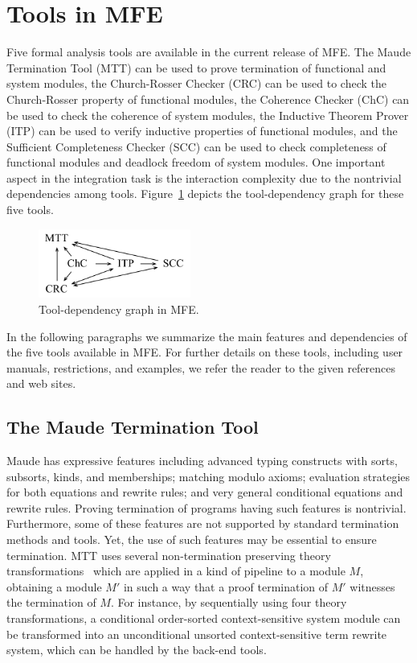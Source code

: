 \section{Tools in MFE}
\label{sec.tools}

Five formal analysis tools are available 
in the current release of MFE.
The Maude Termination Tool (MTT) can be used
to prove termination of functional and
system modules, the Church-Rosser Checker (CRC)
can be used to check the Church-Rosser property 
of functional modules, the Coherence Checker (ChC)
can be used to check the coherence of system modules,
the Inductive Theorem Prover (ITP) can be used to verify 
inductive properties of functional modules, and
the Sufficient Completeness Checker (SCC) can
be used to check completeness of functional modules
and deadlock freedom of system modules.
One important aspect in the integration task
is the interaction complexity due to the nontrivial 
dependencies among tools. Figure~\ref{fig.tool-dep}
depicts the tool-dependency graph for these five tools.

\begin{figure}[htbp]
\begin{center}
\includegraphics[width=5cm]{tool-dep}
\caption{Tool-dependency graph in MFE.}
\label{fig.tool-dep}
\end{center}
\end{figure}

In the following paragraphs 
we summarize the main features
and dependencies of the five tools available in MFE. 
For further details on these tools, including user
manuals, restrictions, and examples, we refer the reader
to the given references and web sites.

\subsection{The Maude Termination Tool}
\label{sec.mtt}


Maude has expressive features including advanced typing constructs
with sorts, subsorts, kinds, and memberships; matching modulo axioms;
evaluation strategies for both equations and rewrite rules; and very 
general conditional equations and rewrite rules. Proving termination
of programs having such features is nontrivial. Furthermore, some of
these features are not supported by standard termination methods and
tools. Yet, the use of such features may be essential to ensure termination.
MTT uses several non-termination preserving theory 
transformations~\cite{Duran-Lucas-Meseguer:2009-prole,Duran-Lucas-Meseguer:2009-frocos}
which are applied in a kind of pipeline to a module $M$, obtaining
a module $M'$ in such a way that a proof termination of 
$M'$ witnesses the termination of $M$. For instance, 
by sequentially using four theory transformations,
a conditional order-sorted context-sensitive system module 
can be transformed into an unconditional unsorted
context-sensitive term rewrite system, which can be 
handled by the back-end tools.

